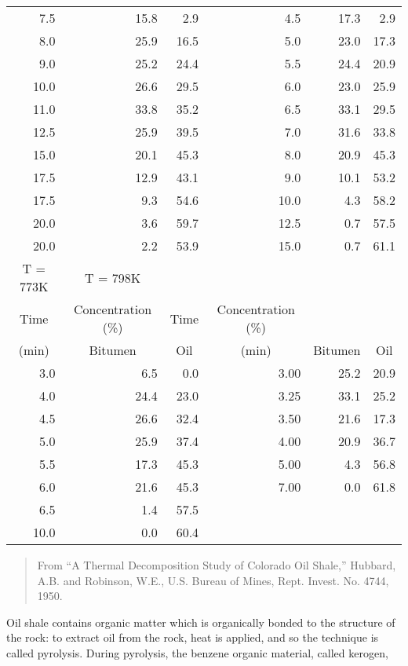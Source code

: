 \begin{table}
\begin{center}
\begin{tabular}{r r r r r r}
      7.5&15.8&2.9&4.5&17.3&2.9\\
      8.0&25.9&16.5&5.0&23.0&17.3\\
      9.0&25.2&24.4&5.5&24.4&20.9\\
      10.0&26.6&29.5&6.0&23.0&25.9\\
      11.0&33.8&35.2&6.5&33.1&29.5\\
      12.5&25.9&39.5&7.0&31.6&33.8\\
      15.0&20.1&45.3&8.0&20.9&45.3\\
      17.5&12.9&43.1&9.0&10.1&53.2\\
      17.5&9.3&54.6&10.0&4.3&58.2\\
      20.0&3.6&59.7&12.5&0.7&57.5\\
      20.0&2.2&53.9&15.0&0.7&61.1\\
      \hline
      \multicolumn{1}{c}{T = 773K}&\multicolumn{1}{c}{T = 798K}\\
      \multicolumn{1}{c}{Time}&\multicolumn{1}{c}{Concentration (\%)}&
      \multicolumn{1}{c}{Time}&\multicolumn{1}{c}{Concentration (\%)}\\
      \multicolumn{1}{c}{(min)}&\multicolumn{1}{c}{Bitumen}&
      \multicolumn{1}{c}{Oil}&\multicolumn{1}{c}{(min)}&
      \multicolumn{1}{c}{Bitumen}&\multicolumn{1}{c}{Oil}\\
      \hline
      3.0&6.5&0.0&3.00&25.2&20.9\\
      4.0&24.4&23.0&3.25&33.1&25.2\\
      4.5&26.6&32.4&3.50&21.6&17.3\\
      5.0&25.9&37.4&4.00&20.9&36.7\\
      5.5&17.3&45.3&5.00&4.3&56.8\\
      6.0&21.6&45.3&7.00&0.0&61.8\\
      6.5&1.4&57.5&\\
      10.0&0.0&60.4&\\
    \end{tabular}
  \end{center}
\begin{quote}\small
  From ``A Thermal Decomposition Study of Colorado Oil Shale,'' Hubbard,
  A.B. and Robinson, W.E., U.S. Bureau of Mines, Rept. Invest.  No. 4744,
  1950.
\end{quote}
\end{table}
Oil shale contains organic matter which is organically bonded to
the structure of the rock:
to extract oil from the rock, heat is applied, and so the technique
is called pyrolysis.
During pyrolysis, the benzene organic material, called kerogen,
